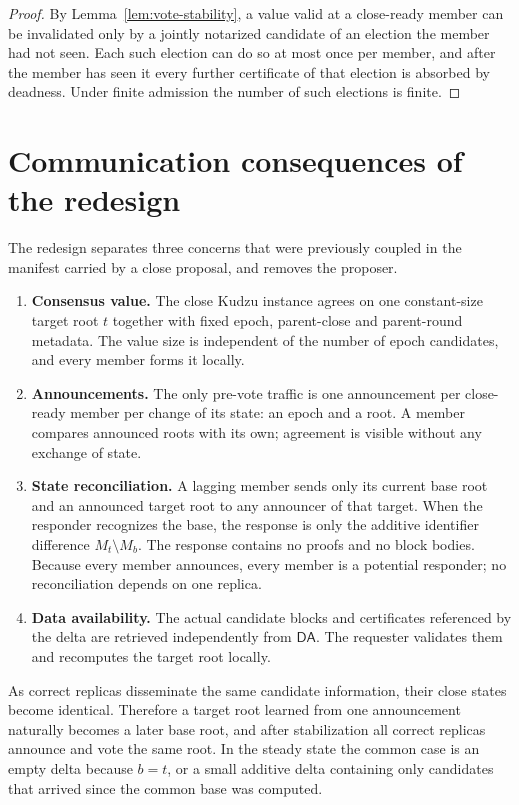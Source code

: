 \documentclass[11pt]{article}
\theoremstyle{remark}
\newcommand{\DA}{\mathsf{DA}}
\begin{document}
\begin{proof}
By Lemma~\ref{lem:vote-stability}, a value valid at a close-ready member can be invalidated only by a jointly notarized candidate of an election the member had not seen. Each such election can do so at most once per member, and after the member has seen it every further certificate of that election is absorbed by deadness. Under finite admission the number of such elections is finite.
\end{proof}

\section{Communication consequences of the redesign}

The redesign separates three concerns that were previously coupled in the manifest carried by a close proposal, and removes the proposer.

\begin{enumerate}[leftmargin=2.0em]
  \item \textbf{Consensus value.} The close Kudzu instance agrees on one constant-size target root $t$ together with fixed epoch, parent-close and parent-round metadata. The value size is independent of the number of epoch candidates, and every member forms it locally.

  \item \textbf{Announcements.} The only pre-vote traffic is one announcement per close-ready member per change of its state: an epoch and a root. A member compares announced roots with its own; agreement is visible without any exchange of state.

  \item \textbf{State reconciliation.} A lagging member sends only its current base root and an announced target root to any announcer of that target. When the responder recognizes the base, the response is only the additive identifier difference $M_t\setminus M_b$. The response contains no proofs and no block bodies. Because every member announces, every member is a potential responder; no reconciliation depends on one replica.

  \item \textbf{Data availability.} The actual candidate blocks and certificates referenced by the delta are retrieved independently from $\DA$. The requester validates them and recomputes the target root locally.
\end{enumerate}

As correct replicas disseminate the same candidate information, their close states become identical. Therefore a target root learned from one announcement naturally becomes a later base root, and after stabilization all correct replicas announce and vote the same root. In the steady state the common case is an empty delta because $b=t$, or a small additive delta containing only candidates that arrived since the common base was computed.
\end{document}
